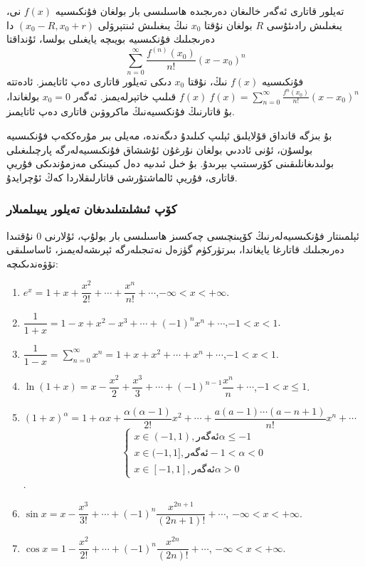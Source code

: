 \begin{MyDefinition}{تەيلور قاتارى}{}
	ئەگەر خالىغان دەرىجىدە ھاسىلىسى بار بولغان فۇنكىسىيە
$f(x)$
نى، يىغىلىش رادىئۇسى 
$R$
بولغان نۇقتا
$x_0$
نىڭ يىغىلىش ئىنتېرۋلى 
$(x_0-R,x_0+r)$
دا دەرىجىلىك فۇنكىسىيە بويىچە يايغىلى بولسا، ئۇنداقتا
$$
\sum\limits_{n=0}^\infty \frac{f^{(n)}(x_0)}{n!}(x-x_0)^n
$$
فۇنكىسىيە
$f(x)$
نىڭ، نۇقتا 
$x_0$
دىكى تەيلور قاتارى دەپ ئاتايمىز. ئادەتتە
$f(x) ~ f(x) =  \sum\limits_{n=0}^\infty \frac{f^{n}(x_0)}{n!}(x-x_0)^n$
قىلىپ خاتېرلەيمىز. ئەگەر 
$x_0 = 0$
بولغاندا، بۇ قاتارنىڭ فۇنكسىيەنىڭ ماكروۋىن قاتارى دەپ ئاتايمىز.
\end{MyDefinition}
بۇ بىزگە قانداق قۇلايلىق ئېلىپ كىلىدۇ دىگەندە، مەيلى بىر مۇرەككەپ فۇنكىسىيە بولسۇن، ئۇنى ئاددىي بولغان نۇرغۇن ئۇششاق فۇنكىسىيەلەرگە پارچىلىغىلى بولىدىغانلىقىنى كۆرسىتىپ بېرىدۇ. بۇ خىل ئىدىيە دەل كىيىنكى مەزمۇندىكى فۇريې قاتارى، فۇريې ئالماشتۇرشى قاتارلىقلاردا كەڭ ئۇچرايدۇ.
\subsubsection{كۆپ ئىشلىتىلىدىغان تەيلور يىيىلمىلار}
ئېلمىنتار فۇنكىسىيەلەرنىڭ كۆپىنچىسى چەكسىز ھاسىلىسى بار بولۇپ، ئۇلارنى 0 نۇقتىدا دەرىجىلىك قاتارغا يايغاندا، بىرتۈركۈم گۈزەل نەتىجىلەرگە ئېرىشەلەيمىز، ئاساسلىقى تۆۋەندىكىچە:
\begin{english}
\begin{enumerate}
	\item $e^x =1+x+\dfrac{x^2}{2!}+\cdots+\dfrac{x^n}{n!}+\cdots$,$-\infty<x<+\infty$.
	\item $\dfrac{1}{1+x} =1-x+x^2-x^3+\cdots+(-1)^nx^n+\cdots$,$-1<x<1$.
	\item $\dfrac{1}{1-x} =\sum\limits_{n=0}^\infty x^n=1+x+x^2+\cdots+x^n+\cdots$,$-1<x<1$.
	\item $\ln(1+x)=x-\dfrac{x^2}{2}+\dfrac{x^3}{3}+\cdots+(-1)^{n-1}\dfrac{x^n}{n}+\cdots$,$-1<x\leqslant1$.
	\item $(1+x)^\alpha=1+\alpha x+\dfrac{\alpha(\alpha-1)}{2!}x^2+\cdots+ \dfrac{a(a-1)\cdots(a-n+1)}{n!}x^n+\cdots$
	$$\left\{\begin{array}{l}
		x\in(-1,1),\text{ئەگەر}\alpha\leqslant-1 \\
		x\in(-1,1],\text{ئەگەر}-1<\alpha<0 \\
		x\in[-1,1],\text{ئەگەر}\alpha>0
	\end{array}\right.$$.

	\item $\sin x=x-\dfrac{x^3}{3!}+\cdots+(-1)^n\dfrac{x^{2n+1}}{(2n+1)!}+\cdots$, $-\infty<x<+\infty$.
	\item $\cos x=1-\dfrac{x^2}{2!}+\cdots+(-1)^n\dfrac{x^{2n}}{(2n)!}+\cdots$, $-\infty<x<+\infty$.
\end{enumerate}
\end{english}

